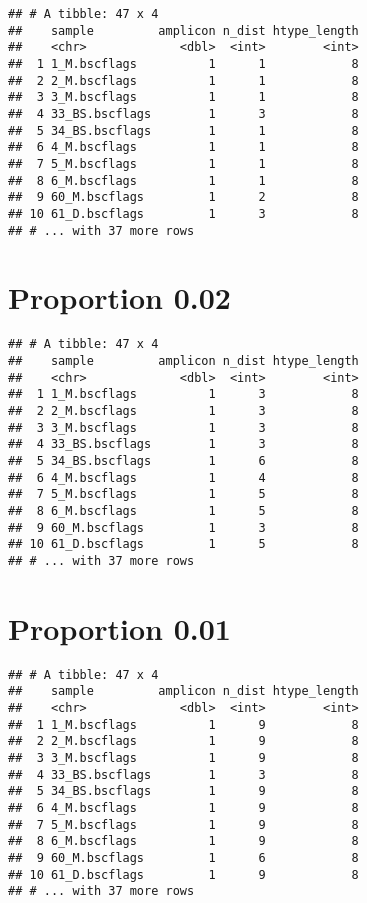 \documentclass[
]{article}
\begin{document}
\begin{verbatim}
## # A tibble: 47 x 4
##    sample         amplicon n_dist htype_length
##    <chr>             <dbl>  <int>        <int>
##  1 1_M.bscflags          1      1            8
##  2 2_M.bscflags          1      1            8
##  3 3_M.bscflags          1      1            8
##  4 33_BS.bscflags        1      3            8
##  5 34_BS.bscflags        1      1            8
##  6 4_M.bscflags          1      1            8
##  7 5_M.bscflags          1      1            8
##  8 6_M.bscflags          1      1            8
##  9 60_M.bscflags         1      2            8
## 10 61_D.bscflags         1      3            8
## # ... with 37 more rows
\end{verbatim}

\hypertarget{proportion-0.02}{%
\section{Proportion 0.02}\label{proportion-0.02}}

\begin{verbatim}
## # A tibble: 47 x 4
##    sample         amplicon n_dist htype_length
##    <chr>             <dbl>  <int>        <int>
##  1 1_M.bscflags          1      3            8
##  2 2_M.bscflags          1      3            8
##  3 3_M.bscflags          1      3            8
##  4 33_BS.bscflags        1      3            8
##  5 34_BS.bscflags        1      6            8
##  6 4_M.bscflags          1      4            8
##  7 5_M.bscflags          1      5            8
##  8 6_M.bscflags          1      5            8
##  9 60_M.bscflags         1      3            8
## 10 61_D.bscflags         1      5            8
## # ... with 37 more rows
\end{verbatim}

\hypertarget{proportion-0.01}{%
\section{Proportion 0.01}\label{proportion-0.01}}

\begin{verbatim}
## # A tibble: 47 x 4
##    sample         amplicon n_dist htype_length
##    <chr>             <dbl>  <int>        <int>
##  1 1_M.bscflags          1      9            8
##  2 2_M.bscflags          1      9            8
##  3 3_M.bscflags          1      9            8
##  4 33_BS.bscflags        1      3            8
##  5 34_BS.bscflags        1      9            8
##  6 4_M.bscflags          1      9            8
##  7 5_M.bscflags          1      9            8
##  8 6_M.bscflags          1      9            8
##  9 60_M.bscflags         1      6            8
## 10 61_D.bscflags         1      9            8
## # ... with 37 more rows
\end{verbatim}
\end{document}
